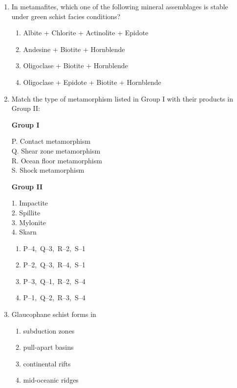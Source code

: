 \documentclass[journal,12pt,onecolumn]{IEEEtran}
\theoremstyle{remark}
\begin{document}
\begin{enumerate}
\item In metamafites, which one of the following mineral assemblages is stable under green schist facies conditions?  
\begin{enumerate}
\item Albite + Chlorite + Actinolite + Epidote
\item Andesine + Biotite + Hornblende
\item Oligoclase + Biotite + Hornblende
\item Oligoclase + Epidote + Biotite + Hornblende
\end{enumerate}


\item Match the type of metamorphism listed in Group I with their products in Group II:

\begin{multicols}{2}
\textbf{Group I}
\begin{flushleft}
P. Contact metamorphism\\
Q. Shear zone metamorphism\\
R. Ocean floor metamorphism\\
S. Shock metamorphism
\end{flushleft}

\columnbreak

\textbf{Group II}
\begin{flushleft}
1. Impactite\\
2. Spillite\\
3. Mylonite\\
4. Skarn
\end{flushleft}
\end{multicols}

\begin{multicols}{2}
\begin{enumerate}
\item P--4,\ Q--3,\ R--2,\ S--1
\item P--2,\ Q--3,\ R--4,\ S--1
\item P--3,\ Q--1,\ R--2,\ S--4
\item P--1,\ Q--2,\ R--3,\ S--4
\end{enumerate}
\end{multicols}

\item Glaucophane schist forms in  
\begin{multicols}{2}
\begin{enumerate}
\item subduction zones
\item pull-apart basins
\item continental rifts
\item mid-oceanic ridges
\end{enumerate}
\end{multicols}


\end{enumerate}
\end{document}
